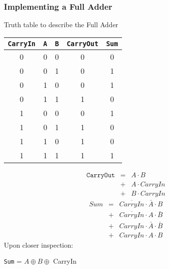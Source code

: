 \begin{frame}\frametitle{Implementing a Full Adder}
Truth table to describe the Full Adder

\begin{multicols}{2}
  {\footnotesize  
\begin{center}
\begin{tabular}{ ccc | cc}
\texttt{CarryIn} & \texttt{A} & \texttt{B} & \texttt{CarryOut} & \texttt{Sum}  \\ \hline
0 & 0 & 0 & 0 & 0  \\ \hline
0 & 0 & 1 & 0 & 1  \\ \hline
0 & 1 & 0 & 0 & 1  \\ \hline
0 & 1 & 1 & 1 & 0  \\ \hline
1 & 0 & 0 & 0 & 1  \\ \hline
1 & 0 & 1 & 1 & 0  \\ \hline
1 & 1 & 0 & 1 & 0  \\ \hline
1 & 1 & 1 & 1 & 1  \\ \hline
\end{tabular}
\end{center}
}
\columnbreak

{\small
\begin{eqnarray*}
\texttt{CarryOut} &=& A \cdot B \\
&+& A \cdot  CarryIn\\
&+& B \cdot  CarryIn    
\end{eqnarray*}
\begin{eqnarray*}
Sum  &=& \overline{CarryIn} \cdot \bar{A} \cdot B\\ 
&+& \overline{CarryIn} \cdot A \cdot \bar{B}\\
& + &CarryIn \cdot \bar{A} \cdot \bar{B}\\ 
& + & CarryIn \cdot A \cdot B
\end{eqnarray*}
Upon closer inspection:

\texttt{Sum} = $A \oplus B \oplus $ CarryIn
}
\end{multicols}

\end{frame}

